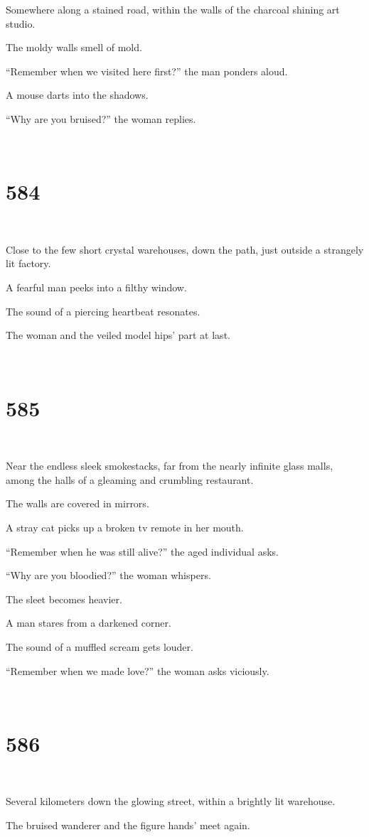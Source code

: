 \documentclass{report}
\begin{document}
Somewhere along a stained road, within the walls of the charcoal shining art studio.

The moldy walls smell of mold.

``Remember when we visited here first?'' the man ponders aloud.

A mouse darts into the shadows.

``Why are you bruised?'' the woman replies.

~
\chapter*{584}
~

Close to the few short crystal warehouses, down the path, just outside a strangely lit factory.

A fearful man peeks into a filthy window.

The sound of a piercing heartbeat resonates.

The woman and the veiled model hips' part at last.

~
\chapter*{585}
~

Near the endless sleek smokestacks, far from the nearly infinite glass malls, among the halls of a gleaming and crumbling restaurant.

The walls are covered in mirrors.

A stray cat picks up a broken tv remote in her mouth.

``Remember when he was still alive?'' the aged individual asks.

``Why are you bloodied?'' the woman whispers.

The sleet becomes heavier.

A man stares from a darkened corner.

The sound of a muffled scream gets louder.

``Remember when we made love?'' the woman asks viciously.

~
\chapter*{586}
~

Several kilometers down the glowing street, within a brightly lit warehouse.

The bruised wanderer and the figure hands' meet again.

~
\end{document}
